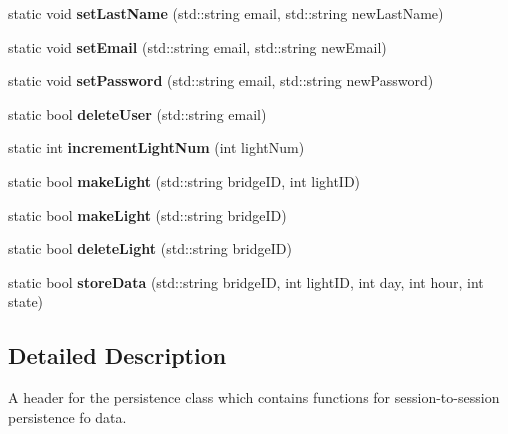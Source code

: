 \begin{DoxyCompactItemize}
\item 
\mbox{\label{class_persistence_a4b2cb9292beb76b51db257124fdce5b1}} 
static void {\bfseries set\+Last\+Name} (std\+::string email, std\+::string new\+Last\+Name)
\item 
\mbox{\label{class_persistence_af894cba0b6c470b215195acb058cee9b}} 
static void {\bfseries set\+Email} (std\+::string email, std\+::string new\+Email)
\item 
\mbox{\label{class_persistence_a372566d9750e77752404f3d55f3a1a8c}} 
static void {\bfseries set\+Password} (std\+::string email, std\+::string new\+Password)
\item 
\mbox{\label{class_persistence_ab8e62d0f6db44b7fa49742d2039f9bc5}} 
static bool {\bfseries delete\+User} (std\+::string email)
\item 
\mbox{\label{class_persistence_a002c9cfa0ea98fde556881382db097e1}} 
static int {\bfseries increment\+Light\+Num} (int light\+Num)
\item 
\mbox{\label{class_persistence_a0af7db5cf8c82b7dd992e7825ab0571b}} 
static bool {\bfseries make\+Light} (std\+::string bridge\+ID, int light\+ID)
\item 
\mbox{\label{class_persistence_afd24e75354c541cd99d3d738954eae19}} 
static bool {\bfseries make\+Light} (std\+::string bridge\+ID)
\item 
\mbox{\label{class_persistence_ab3bcb4f05d486879765662c41d3b697d}} 
static bool {\bfseries delete\+Light} (std\+::string bridge\+ID)
\item 
\mbox{\label{class_persistence_ad568e32f1fb2410aa14275ed392197df}} 
static bool {\bfseries store\+Data} (std\+::string bridge\+ID, int light\+ID, int day, int hour, int state)
\end{DoxyCompactItemize}


\subsection{Detailed Description}
A header for the persistence class which contains functions for session-\/to-\/session persistence fo data. 

